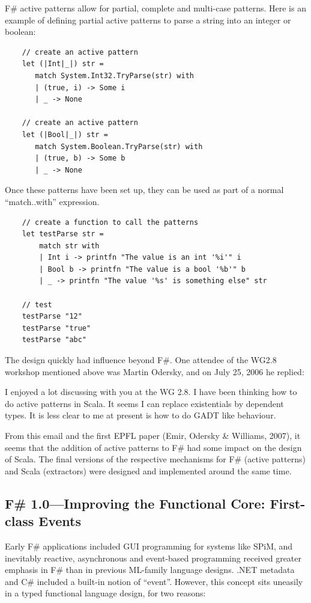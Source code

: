 \documentclass[acmsmall]{acmart}\settopmatter{}
\begin{document}
F\# active patterns allow for partial, complete and multi-case patterns. Here is an example of defining partial active patterns to parse a string into an integer or boolean:

\begin{verbatim}
    // create an active pattern
    let (|Int|_|) str =
       match System.Int32.TryParse(str) with
       | (true, i) -> Some i
       | _ -> None

    // create an active pattern
    let (|Bool|_|) str =
       match System.Boolean.TryParse(str) with
       | (true, b) -> Some b
       | _ -> None
\end{verbatim}
Once these patterns have been set up, they can be used as part of a normal “match..with” expression.

\begin{verbatim}
    // create a function to call the patterns
    let testParse str = 
        match str with
        | Int i -> printfn "The value is an int '%i'" i
        | Bool b -> printfn "The value is a bool '%b'" b
        | _ -> printfn "The value '%s' is something else" str

    // test
    testParse "12"
    testParse "true"
    testParse "abc"
\end{verbatim}

The design quickly had influence beyond F\#. One attendee of the WG2.8 workshop mentioned above was Martin Odersky, and on July 25, 2006 he replied:

\begin{verbquote}
I enjoyed a lot discussing with you at the WG 2.8. I have been thinking how to do active patterns in Scala. It seems I can replace existentials by dependent types. It is less clear to me at present is how to do GADT like behaviour. 
\end{verbquote}


From this email and the first EPFL paper (Emir, Odersky \& Williams, 2007), it seems that the addition of active patterns to F\# had some impact on the design of Scala. The final versions of the respective mechanisms for F\# (active patterns) and Scala (extractors) were designed and implemented around the same time.    


\subsection*{F\# 1.0---Improving the Functional Core: First-class Events}

Early F\# applications included GUI programming for systems like SPiM, and inevitably reactive, asynchronous and event-based programming received greater emphasis in F\# than in previous ML-family language designs. .NET metadata and C\# included a built-in notion of “event”. However, this concept sits uneasily in a typed functional language design, for two reasons:
\end{document}
